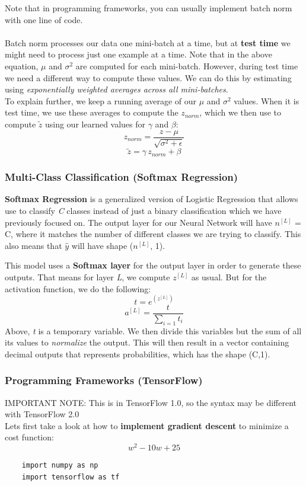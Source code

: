 \documentclass[11pt, a4paper]{article}
\begin{document}
\begin{spacing}{1.1}
	Note that in programming frameworks, you can usually implement batch norm with one line of code. \\~\\
	Batch norm processes our data one mini-batch at a time, but at \textbf{test time} we might need to process just one example at a time. Note that in the above equation, $\mu$ and $\sigma^2$ are computed for each mini-batch. However, during test time we need a different way to compute these values. We can do this by estimating using \textit{exponentially weighted averages across all mini-batches}. \vspace*{1mm} \\
	To explain further, we keep a running average of our $\mu$ and $\sigma^2$ values. When it is test time, we use these averages to compute the $z_{norm}$, which we then use to compute $\tilde{z}$ using our learned values for $\gamma$ and $\beta$: $$z_{norm} = \frac{z-\mu}{\sqrt{\sigma^2+\epsilon}} $$ $$\tilde{z} = \gamma\, z_{norm} + \beta $$ 
	\subsubsection{Multi-Class Classification (Softmax Regression)}
	\textbf{Softmax Regression} is a generalized version of Logistic Regression that allows use to classify \textit{C} classes instead of just a binary classification which we have previously focused on. The output layer for our Neural Network will have $n^{[L]}$ = C, where it matches the number of different classes we are trying to classify. This also means that $\hat{y}$ will have shape ($n^{[L]}$, 1). \newpage

	\noindent This model uses a \textbf{Softmax layer} for the output layer in order to generate these outputs. That means for layer \textit{L}, we compute $z^{[L]}$ as usual. But for the activation function, we do the following: $$ t = e^{(z^{[L]})} $$ $$ a^{[L]} = \frac{t}{\sum_{i=1} t_i} $$
	Above, \textit{t} is a temporary variable. We then divide this variables but the sum of all its values to \textit{normalize} the output. This will then result in a vector containing decimal outputs that represents probabilities, which has the shape (C,1). 
	\subsubsection{Programming Frameworks (TensorFlow)}
	IMPORTANT NOTE: This is in TensorFlow 1.0, so the syntax may be different with TensorFlow 2.0 \vspace*{2mm} \\
	Lets first take a look at how to \textbf{implement gradient descent} to minimize a cost function: $$ w^2 - 10w + 25 $$
	\begin{lstlisting}
	import numpy as np
	import tensorflow as tf
	

\end{lstlisting}
\end{spacing}
\end{document}
